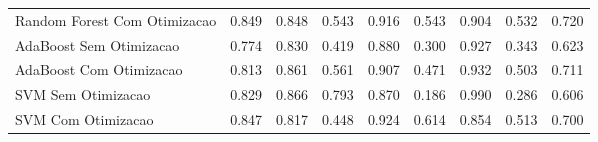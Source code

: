 \begin{table}[H]
\begin{adjustwidth}{ -1in }{ -1in }
\begin{tabular}{lrrrrrrrr}
      Random Forest Com Otimizacao &                        0.849 &                         0.848 &                            0.543 &                            0.916 &                          0.543 &                          0.904 &                                     0.532 &                                 0.720 \\
           AdaBoost Sem Otimizacao &                        0.774 &                         0.830 &                            0.419 &                            0.880 &                          0.300 &                          0.927 &                                     0.343 &                                 0.623 \\
           AdaBoost Com Otimizacao &                        0.813 &                         0.861 &                            0.561 &                            0.907 &                          0.471 &                          0.932 &                                     0.503 &                                 0.711 \\
                SVM Sem Otimizacao &                        0.829 &                         0.866 &                            0.793 &                            0.870 &                          0.186 &                          0.990 &                                     0.286 &                                 0.606 \\
                SVM Com Otimizacao &                        0.847 &                         0.817 &                            0.448 &                            0.924 &                          0.614 &                          0.854 &                                     0.513 &                                 0.700 \\
\bottomrule
\end{tabular}
    \end{adjustwidth}
    \renewcommand{\arraystretch}{1.0} %
\end{table}
